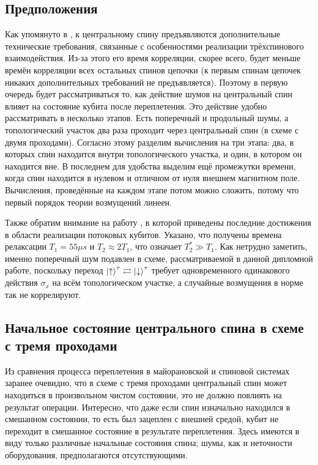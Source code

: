 \documentclass[a4paper,12pt]{article}
\theoremstyle{plain} %
\theoremstyle{definition} %
\theoremstyle{remark} %
\begin{document}
\subsection{Предположения}
Как упомянуто в \cite{main}, к центральному спину предъявляются дополнительные технические требования, связанные с особенностями реализации трёхспинового взаимодействия. 
Из-за этого его время корреляции, скорее всего, будет меньше времён корреляции всех остальных спинов цепочки (к первым спинам цепочек никаких дополнительных требований не предъявляется). 
Поэтому в первую очередь будет рассматриваться то, как действие шумов на центральный спин влияет на состояние кубита после переплетения. 
Это действие удобно рассматривать в несколько этапов. 
Есть поперечный и продольный шумы, а топологический участок два раза проходит через центральный спин (в схеме с двумя проходами).
Согласно этому разделим вычисления на три этапа: два, в которых спин находится внутри топологического участка, и один, в котором он находится вне. 
В последнем для удобства выделим ещё промежутки времени, когда спин находится в нулевом и отличном от нуля внешнем магнитном поле.
Вычисления, проведённые на каждом этапе потом можно сложить, потому что первый порядок теории возмущений линеен.

Также обратим внимание на работу \cite{flux_qubit}, в которой приведены последние достижения в области реализации потоковых кубитов. Указано, что получены времена релаксации $T_1 = 55 \mu s$ и $T_2 \approx 2 T_1$, что означает $T_2^* \gg T_1$. Как нетрудно заметить, именно поперечный шум подавлен в схеме, рассматриваемой в данной дипломной работе, поскольку переход $\ket{\uparrow}^\tau \rightleftarrows \ket{\downarrow}^\tau$ требует одновременного одинакового действия $\sigma_x$ на всём топологическом участке, а случайные возмущения в норме так не коррелируют.

\subsection{Начальное состояние центрального спина в схеме с тремя проходами}

Из сравнения процесса переплетения в майорановской и спиновой системах заранее очевидно, что в схеме с тремя проходами центральный спин может находиться в произвольном чистом состоянии, это не должно повлиять на результат операции.
Интересно, что даже если спин изначально находился в смешанном состоянии, то есть был зацеплен с внешней средой, кубит не переходит в смешанное состояние в результате переплетения. 
Здесь имеются в виду только различные начальные состояния спина; шумы, как и неточности оборудования, предполагаются отсутствующими.
\end{document}

